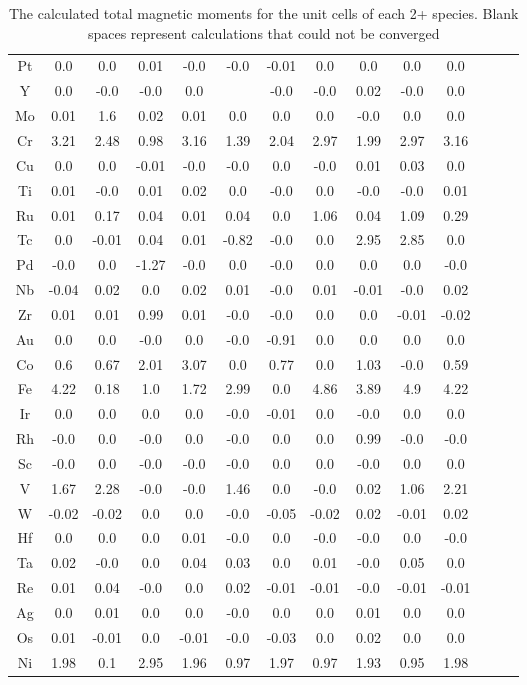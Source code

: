 \documentclass{article}
\begin{document}
\begin{table}
\begin{center}
\begin{tabular}{| c | c | c | c | c | c | c | c | c | c | c | c | c | c |}
Pt & 0.0 & 0.0 & 0.01 & -0.0 & -0.0 & -0.01 & 0.0 & 0.0 & 0.0 & 0.0 &  \\
Y & 0.0 & -0.0 & -0.0 & 0.0 &  & -0.0 & -0.0 & 0.02 & -0.0 & 0.0 &  \\
Mo & 0.01 & 1.6 & 0.02 & 0.01 & 0.0 & 0.0 & 0.0 & -0.0 & 0.0 & 0.0 &  \\
Cr & 3.21 & 2.48 & 0.98 & 3.16 & 1.39 & 2.04 & 2.97 & 1.99 & 2.97 & 3.16 &  \\
Cu & 0.0 & 0.0 & -0.01 & -0.0 & -0.0 & 0.0 & -0.0 & 0.01 & 0.03 & 0.0 &  \\
Ti & 0.01 & -0.0 & 0.01 & 0.02 & 0.0 & -0.0 & 0.0 & -0.0 & -0.0 & 0.01 &  \\
Ru & 0.01 & 0.17 & 0.04 & 0.01 & 0.04 & 0.0 & 1.06 & 0.04 & 1.09 & 0.29 &  \\
Tc & 0.0 & -0.01 & 0.04 & 0.01 & -0.82 & -0.0 & 0.0 & 2.95 & 2.85 & 0.0 &  \\
Pd & -0.0 & 0.0 & -1.27 & -0.0 & 0.0 & -0.0 & 0.0 & 0.0 & 0.0 & -0.0 &  \\
Nb & -0.04 & 0.02 & 0.0 & 0.02 & 0.01 & -0.0 & 0.01 & -0.01 & -0.0 & 0.02 &  \\
Zr & 0.01 & 0.01 & 0.99 & 0.01 & -0.0 & -0.0 & 0.0 & 0.0 & -0.01 & -0.02 &  \\
Au & 0.0 & 0.0 & -0.0 & 0.0 & -0.0 & -0.91 & 0.0 & 0.0 & 0.0 & 0.0 &  \\
Co & 0.6 & 0.67 & 2.01 & 3.07 & 0.0 & 0.77 & 0.0 & 1.03 & -0.0 & 0.59 &  \\
Fe & 4.22 & 0.18 & 1.0 & 1.72 & 2.99 & 0.0 & 4.86 & 3.89 & 4.9 & 4.22 &  \\
Ir & 0.0 & 0.0 & 0.0 & 0.0 & -0.0 & -0.01 & 0.0 & -0.0 & 0.0 & 0.0 &  \\
Rh & -0.0 & 0.0 & -0.0 & 0.0 & -0.0 & 0.0 & 0.0 & 0.99 & -0.0 & -0.0 &  \\
Sc & -0.0 & 0.0 & -0.0 & -0.0 & -0.0 & 0.0 & 0.0 & -0.0 & 0.0 & 0.0 &  \\
V & 1.67 & 2.28 & -0.0 & -0.0 & 1.46 & 0.0 & -0.0 & 0.02 & 1.06 & 2.21 &  \\
W & -0.02 & -0.02 & 0.0 & 0.0 & -0.0 & -0.05 & -0.02 & 0.02 & -0.01 & 0.02 &  \\
Hf & 0.0 & 0.0 & 0.0 & 0.01 & -0.0 & 0.0 & -0.0 & -0.0 & 0.0 & -0.0 &  \\
Ta & 0.02 & -0.0 & 0.0 & 0.04 & 0.03 & 0.0 & 0.01 & -0.0 & 0.05 & 0.0 &  \\
Re & 0.01 & 0.04 & -0.0 & 0.0 & 0.02 & -0.01 & -0.01 & -0.0 & -0.01 & -0.01 &  \\
Ag & 0.0 & 0.01 & 0.0 & 0.0 & -0.0 & 0.0 & 0.0 & 0.01 & 0.0 & 0.0 &  \\
Os & 0.01 & -0.01 & 0.0 & -0.01 & -0.0 & -0.03 & 0.0 & 0.02 & 0.0 & 0.0 &  \\
Ni & 1.98 & 0.1 & 2.95 & 1.96 & 0.97 & 1.97 & 0.97 & 1.93 & 0.95 & 1.98 &  \\
\hline
\end{tabular}
\end{center}
\caption{The calculated total magnetic moments for the unit cells of each 2+ species. Blank spaces represent calculations that could not be converged}
\label{table:mags}
\end{table}
\end{document}
